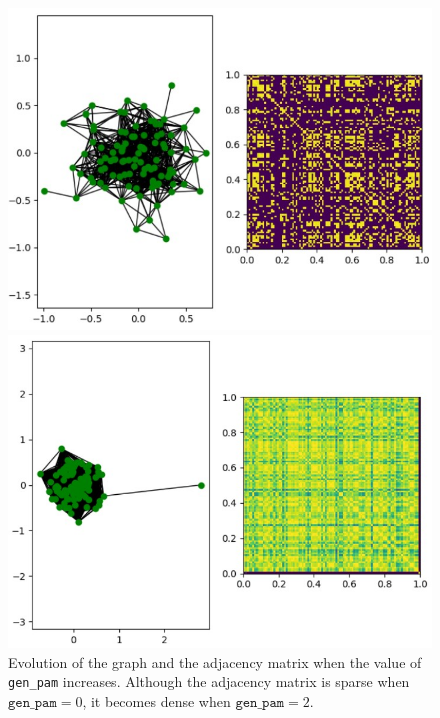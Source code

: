 \documentclass[a4paper, 11pt]{report}
\begin{document}
    \begin{figure}[!h]
     \begin{minipage}{0.5\textwidth}
     \begin{center}
         \includegraphics[scale=0.65]{images/gen_pam_0.jpg}
         \caption{$\texttt{gen\_pam} = 0$}
     \end{center}
     \end{minipage}
     \hfill
     \begin{minipage}{0.5\textwidth}
     \begin{center}
         \includegraphics[scale=0.65]{images/gen_pam_2.jpg}
         \caption{$\texttt{gen\_pam} = 2$}
     \end{center}
     \end{minipage}
        \caption{Evolution of the graph and the adjacency matrix when the value of \texttt{gen\_pam} increases. Although the adjacency matrix is sparse when $\texttt{gen\_pam} = 0$, it becomes dense when $\texttt{gen\_pam} = 2$.}
        \label{fig:gen-pam-influence}
    \end{figure}
    
\end{document}
